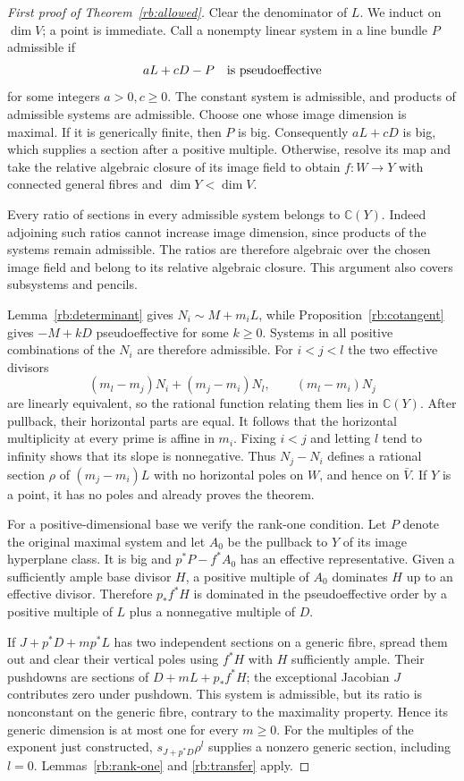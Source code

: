 \begin{proof}[First proof of Theorem~\ref{rb:allowed}]
Clear the denominator of $L$.  We induct on $\dim V$; a point is
immediate.  Call a nonempty linear system in a line bundle $P$
admissible if
\[
               aL+cD-P\quad\hbox{is pseudoeffective}
\]
for some integers $a>0,c\geq0$.  The constant system is admissible,
and products of admissible systems are admissible.  Choose one whose
image dimension is maximal.  If it is generically finite, then $P$ is
big.  Consequently $aL+cD$ is big, which supplies a section after a
positive multiple.  Otherwise, resolve its map and take the relative
algebraic closure of its image field to obtain $f:W\to Y$ with
connected general fibres and $\dim Y<\dim V$.

Every ratio of sections in every admissible system belongs to
$\mathbb C(Y)$.  Indeed adjoining such ratios cannot increase image
dimension, since products of the systems remain admissible.
The ratios are therefore algebraic over the chosen image field and
belong to its relative algebraic closure.  This argument also covers
subsystems and pencils.

Lemma~\ref{rb:determinant} gives $N_i\sim M+m_iL$, while
Proposition~\ref{rb:cotangent} gives $-M+kD$ pseudoeffective for some
$k\geq0$.  Systems in all positive combinations of the $N_i$ are
therefore admissible.  For $i<j<l$ the two effective divisors
\[
 (m_l-m_j)N_i+(m_j-m_i)N_l,
 \qquad (m_l-m_i)N_j
\]
are linearly equivalent, so the rational function relating them lies
in $\mathbb C(Y)$.  After pullback, their horizontal parts are equal.
It follows that the horizontal multiplicity at every prime is affine
in $m_i$.  Fixing $i<j$ and letting $l$ tend to infinity shows that its
slope is nonnegative. Thus $N_j-N_i$ defines a rational section $\rho$ of
$(m_j-m_i)L$ with no horizontal poles on $W$, and hence on $\bar V$.
If $Y$ is a point, it has no poles and already proves the theorem.

For a positive-dimensional base we verify the rank-one condition.
Let $P$ denote the original maximal system and let $A_0$ be the
pullback to $Y$ of its image hyperplane class.  It is big and
$p^*P-f^*A_0$ has an effective representative.  Given a sufficiently
ample base divisor $H$, a positive multiple of $A_0$ dominates $H$
up to an effective divisor.  Therefore $p_*f^*H$ is dominated in the
pseudoeffective order by a positive multiple of $L$ plus a nonnegative
multiple of $D$.

If $J+p^*D+mp^*L$ has two independent sections on a generic fibre,
spread them out and clear their vertical poles using $f^*H$ with $H$
sufficiently ample.  Their pushdowns are sections of
$D+mL+p_*f^*H$; the exceptional Jacobian $J$ contributes zero under
pushdown.  This system is admissible, but its ratio is nonconstant on
the generic fibre, contrary to the maximality property.  Hence its
generic dimension is at most one for every $m\geq0$.  For the multiples
of the exponent just constructed, $s_{J+p^*D}\rho^l$ supplies a nonzero
generic section, including $l=0$.  Lemmas~\ref{rb:rank-one} and
\ref{rb:transfer} apply.


\end{proof}
